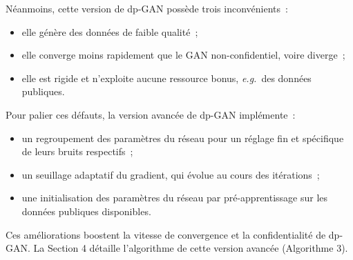 \documentclass[a4paper,11pt]{article}
\theoremstyle{definition}
\newcommand{\eg}{\textit{e.g.}}
\begin{document}
\begin{multicols}{2}
Néanmoins, cette version de dp-GAN possède trois inconvénients : \begin{itemize}\item elle génère des données de faible qualité ; \item elle converge moins rapidement que le GAN non-confidentiel, voire diverge ; \item elle est rigide et n'exploite aucune ressource bonus, \eg\ des données publiques.\end{itemize} Pour palier ces défauts, la version avancée de dp-GAN implémente : \begin{itemize}\item un regroupement des paramètres du réseau pour un réglage fin et spécifique de leurs bruits respectifs ; \item un seuillage adaptatif du gradient, qui évolue au cours des itérations ; \item une initialisation des paramètres du réseau par pré-apprentissage sur les données publiques disponibles.\end{itemize} Ces améliorations boostent la vitesse de convergence et la confidentialité de dp-GAN. La Section 4 détaille l'algorithme de  cette version avancée (Algorithme 3).


\end{multicols}
\end{document}
